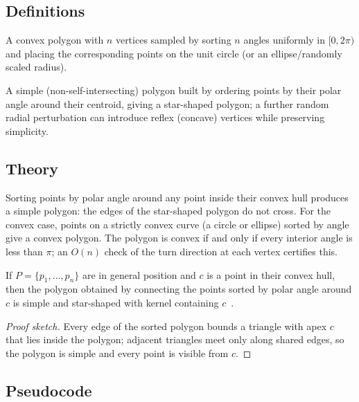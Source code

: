 \subsection{Definitions}
\begin{definition}\label{def:random_convex_polygon}
A convex polygon with $n$ vertices sampled by sorting $n$ angles uniformly in
$[0, 2\pi)$ and placing the corresponding points on the unit circle (or an
ellipse/randomly scaled radius).
\end{definition}

\begin{definition}\label{def:random_simple_polygon}
A simple (non-self-intersecting) polygon built by ordering points by their
polar angle around their centroid, giving a star-shaped polygon; a further
random radial perturbation can introduce reflex (concave) vertices while
preserving simplicity.
\end{definition}

\subsection{Theory}
Sorting points by polar angle around any point inside their convex hull
produces a simple polygon: the edges of the star-shaped polygon do not cross.
For the convex case, points on a strictly convex curve (a circle or ellipse)
sorted by angle give a convex polygon. The polygon is convex if and only if
every interior angle is less than $\pi$; an $O(n)$ check of the turn direction
at each vertex certifies this.

\begin{theorem}\label{thm:star_polygonization}
If $P = \{p_1, \dots, p_n\}$ are in general position and $c$ is a point in
their convex hull, then the polygon obtained by connecting the points sorted
by polar angle around $c$ is simple and star-shaped with kernel containing
$c$~\cite{deberg2008}.
\end{theorem}
\begin{proof}[Proof sketch]
Every edge of the sorted polygon bounds a triangle with apex $c$ that lies
inside the polygon; adjacent triangles meet only along shared edges, so the
polygon is simple and every point is visible from $c$.
\end{proof}

\subsection{Pseudocode}

